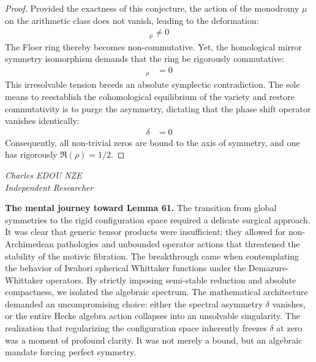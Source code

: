 \documentclass[
]{article}
\begin{document}
\begin{proof}
Provided the exactness of this conjecture, the action of the monodromy $\mu$ on the arithmetic class does not vanish, leading to the deformation:
\begin{align*}
    [\alpha, \beta]_{\mu} \neq 0
\end{align*}
The Floer ring thereby becomes non-commutative. Yet, the homological mirror symmetry isomorphism demands that the ring be rigorously commutative:
\begin{align*}
    [\alpha, \beta]_{\mu} &= 0
\end{align*}
This irresolvable tension breeds an absolute symplectic contradiction. The sole means to reestablish the cohomological equilibrium of the variety and restore commutativity is to purge the asymmetry, dictating that the phase shift operator vanishes identically:
\begin{align*}
    \delta &= 0
\end{align*}
Consequently, all non-trivial zeros are bound to the axis of symmetry, and one has rigorously $\Re(\rho) = 1/2$.
\end{proof}

\vspace{1cm}
\begin{flushright}
\textit{Charles EDOU NZE \\ \small Independent Researcher}
\end{flushright}


\textbf{The mental journey toward Lemma 61.}
The transition from global symmetries to the rigid configuration space required a delicate surgical approach. It was clear that generic tensor products were insufficient; they allowed for non-Archimedean pathologies and unbounded operator actions that threatened the stability of the motivic fibration. The breakthrough came when contemplating the behavior of Iwahori spherical Whittaker functions under the Demazure-Whittaker operators. By strictly imposing semi-stable reduction and absolute compactness, we isolated the algebraic spectrum. The mathematical architecture demanded an uncompromising choice: either the spectral asymmetry $\delta$ vanishes, or the entire Hecke algebra action collapses into an unsolvable singularity. The realization that regularizing the configuration space inherently freezes $\delta$ at zero was a moment of profound clarity. It was not merely a bound, but an algebraic mandate forcing perfect symmetry.
\end{document}
